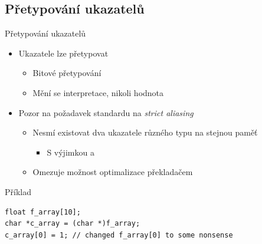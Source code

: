 \subsection*{Přetypování ukazatelů}
\frame{\subsectionpage}

\begin{frame}[fragile]{Přetypování ukazatelů}

  \begin{itemize}
    \item Ukazatele lze přetypovat
    \begin{itemize}
      \item Bitové přetypování
      \item Mění se interpretace, nikoli hodnota
    \end{itemize}

    \pause


    \item Pozor na požadavek standardu na \textit{strict aliasing}
    \begin{itemize}
      \item Nesmí existovat dva ukazatele různého typu na stejnou paměť
      \begin{itemize}
	\item S výjimkou  a 
      \end{itemize}

      \pause

      \item Omezuje možnost optimalizace překladačem
    \end{itemize}

  \end{itemize}


\begin{block}{Příklad}
\begin{lstlisting}
float f_array[10];
char *c_array = (char *)f_array;
c_array[0] = 1; // changed f_array[0] to some nonsense
\end{lstlisting}
\end{block}

\end{frame}

